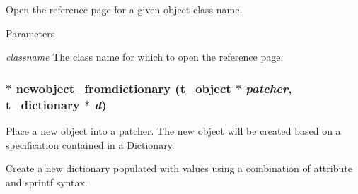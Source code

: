 Open the reference page for a given object class name. 
\begin{DoxyParams}{Parameters}
\item[{\em classname}]The class name for which to open the reference page. \end{DoxyParams}
\hypertarget{group__obj_gaed2c4e1d0c80d929b97ccf07a886faeb}{
\subsubsection[{newobject\_\-fromdictionary}]{$\ast$ newobject\_\-fromdictionary ({\bf t\_\-object} $\ast$ {\em patcher}, \/  {\bf t\_\-dictionary} $\ast$ {\em d})}}
\label{group__obj_gaed2c4e1d0c80d929b97ccf07a886faeb}


Place a new object into a patcher. The new object will be created based on a specification contained in a \hyperlink{group__dictionary}{Dictionary}.

Create a new dictionary populated with values using a combination of attribute and sprintf syntax.


